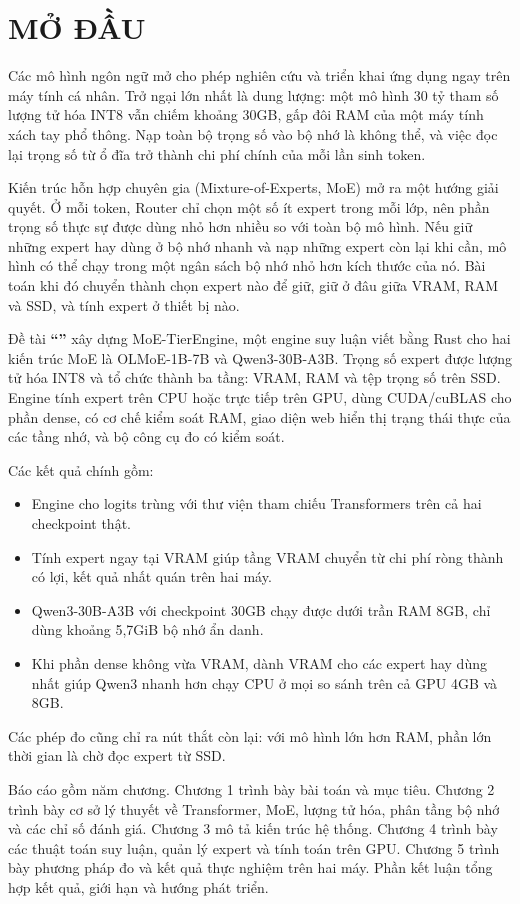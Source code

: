 \chapter*{MỞ ĐẦU}

Các mô hình ngôn ngữ mở cho phép nghiên cứu và triển khai ứng dụng ngay trên máy tính cá nhân. Trở ngại lớn nhất là dung lượng: một mô hình 30 tỷ tham số lượng tử hóa INT8 vẫn chiếm khoảng 30GB, gấp đôi RAM của một máy tính xách tay phổ thông. Nạp toàn bộ trọng số vào bộ nhớ là không thể, và việc đọc lại trọng số từ ổ đĩa trở thành chi phí chính của mỗi lần sinh token.

Kiến trúc hỗn hợp chuyên gia (Mixture-of-Experts, MoE) mở ra một hướng giải quyết. Ở mỗi token, Router chỉ chọn một số ít expert trong mỗi lớp, nên phần trọng số thực sự được dùng nhỏ hơn nhiều so với toàn bộ mô hình. Nếu giữ những expert hay dùng ở bộ nhớ nhanh và nạp những expert còn lại khi cần, mô hình có thể chạy trong một ngân sách bộ nhớ nhỏ hơn kích thước của nó. Bài toán khi đó chuyển thành chọn expert nào để giữ, giữ ở đâu giữa VRAM, RAM và SSD, và tính expert ở thiết bị nào.

Đề tài \textbf{``\reporttitle''} xây dựng MoE-TierEngine, một engine suy luận viết bằng Rust cho hai kiến trúc MoE là OLMoE-1B-7B và Qwen3-30B-A3B. Trọng số expert được lượng tử hóa INT8 và tổ chức thành ba tầng: VRAM, RAM và tệp trọng số trên SSD. Engine tính expert trên CPU hoặc trực tiếp trên GPU, dùng CUDA/cuBLAS cho phần dense, có cơ chế kiểm soát RAM, giao diện web hiển thị trạng thái thực của các tầng nhớ, và bộ công cụ đo có kiểm soát.

Các kết quả chính gồm:
\begin{itemize}
\item Engine cho logits trùng với thư viện tham chiếu Transformers trên cả hai checkpoint thật.
\item Tính expert ngay tại VRAM giúp tầng VRAM chuyển từ chi phí ròng thành có lợi, kết quả nhất quán trên hai máy.
\item Qwen3-30B-A3B với checkpoint 30GB chạy được dưới trần RAM 8GB, chỉ dùng khoảng 5,7GiB bộ nhớ ẩn danh.
\item Khi phần dense không vừa VRAM, dành VRAM cho các expert hay dùng nhất giúp Qwen3 nhanh hơn chạy CPU ở mọi so sánh trên cả GPU 4GB và 8GB.
\end{itemize}
Các phép đo cũng chỉ ra nút thắt còn lại: với mô hình lớn hơn RAM, phần lớn thời gian là chờ đọc expert từ SSD.

Báo cáo gồm năm chương. Chương 1 trình bày bài toán và mục tiêu. Chương 2 trình bày cơ sở lý thuyết về Transformer, MoE, lượng tử hóa, phân tầng bộ nhớ và các chỉ số đánh giá. Chương 3 mô tả kiến trúc hệ thống. Chương 4 trình bày các thuật toán suy luận, quản lý expert và tính toán trên GPU. Chương 5 trình bày phương pháp đo và kết quả thực nghiệm trên hai máy. Phần kết luận tổng hợp kết quả, giới hạn và hướng phát triển.
